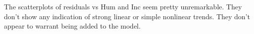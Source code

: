 \documentclass{article}
\begin{document}
\begin{figure}[!h]
  \begin{floatrow}
  \end{floatrow}
\end{figure}
The scatterplots of residuals vs Hum and Inc seem pretty unremarkable. They
don't show any indication of strong linear or simple nonlinear trends.
They don't appear to warrant being added to the model.
\end{document}
